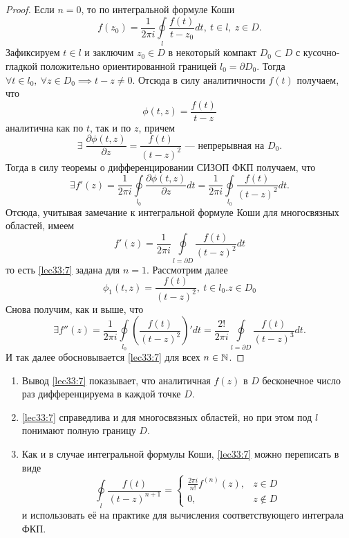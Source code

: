 \documentclass[../../main.tex]{subfiles}
\begin{document}
\begin{proof}
	Если $n=0$, то по интегральной формуле Коши
	\[
	f(z_0) = \frac{1}{2\pi i} \oint \limits_l
	\frac{f(t)}{t-z_0} dt,\ t \in l,\ z \in D.
	\]
	Зафиксируем $t \in l$ и заключим $z_0 \in D$ в
	некоторый компакт $D_0 \subset D$ с 
	кусочно-гладкой положительно ориентированной границей $l_0 = \partial D_0$. 
	Тогда
	$
	\forall t \in l_0,\ 
	\forall z \in D_0
	\implies t - z \neq 0.$
	Отсюда в силу аналитичности $f(t)$ получаем, что
	\begin{equation}
	\label{lec33:9}
	\phi(t, z) = \frac{f(t)}{t-z} 
	\end{equation}
	аналитична как по $t$, так и по $z$, причем
	\[
	\exists\; \frac{\partial \phi(t, z)}{\partial z}
	= \frac{f(t)}{(t-z)^2}
	\text{~--- непрерывная на } D_0.
	\]
	Тогда в силу теоремы о дифференцировании СИЗОП ФКП
	получаем, что 
	\begin{equation}
	\label{lec33:10}
	\exists f'(z) = \frac{1}{2\pi i} \oint\limits_{l_0}
	\frac{\partial \phi(t, z)}{\partial z} dt = 
	\frac{1}{2\pi i} \oint\limits_{l_0}\frac{f(t)}{(t-z)^2} 
	dt.
	\end{equation}
	Отсюда, учитывая замечание к интегральной формуле Коши 
	для многосвязных областей, имеем 
	\[
	f'(z) = \frac{1}{2\pi i} \oint\limits_{l = \partial D} \frac{f(t)}{(t-z)^2} dt
	\]
	то есть \eqref{lec33:7} задана для $n = 1$.
	Рассмотрим далее 
	\[
	\phi_1(t, z) = \frac{f(t)}{(t-z)^2},\ t \in l_0.
	z \in D_0
	\]
	Снова получим, как и выше, что 
	\[
	\exists f''(z) = \frac{1}{2\pi i} \oint\limits_{l_0}
	\left( \frac{f(t)}{(t-z)^2} \right)' dt =
	\frac{2!}{2\pi i} \oint\limits_{l = \partial D}
	\frac{f(t)}{(t-z)^3} dt.
	\]
	И так далее обосновывается \eqref{lec33:7} для всех $n \in \mathbb{N}$.
\end{proof}
\begin{rems}

\;

\begin{enumerate}
	\item Вывод \eqref{lec33:7} показывает, что аналитичная $f(z)$ в 
	$D$ бесконечное число раз дифференцируема в каждой точке
	$D$.
	\item \eqref{lec33:7} справедлива и для многосвязных
	областей, но при этом под $l$ понимают полную границу $D$.
	
	\item Как и в случае интегральной формулы Коши, 
	\eqref{lec33:7} можно переписать в виде 
	\[
	\oint\limits_l \frac{f(t)}{(t-z)^{n+1}} = 
	\begin{cases}
	\frac{2\pi i}{n!} f^{(n)}(z),& z \in D \\
	0,& z \notin D
	\end{cases}
	\]
	и использовать её на практике для вычисления
	соответствующего интеграла ФКП.
\end{enumerate}

\end{rems}
\end{document}
